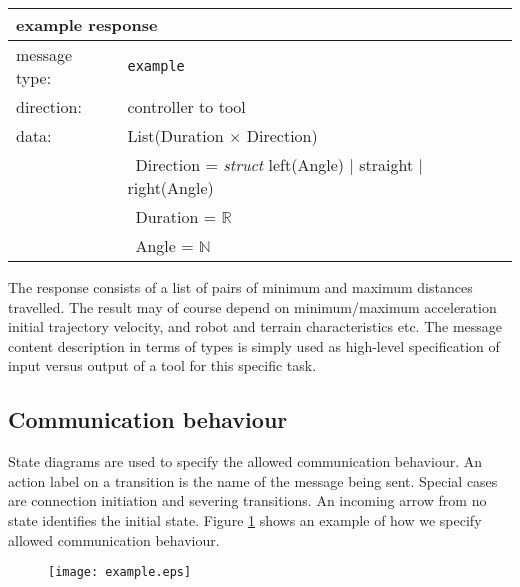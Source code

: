\documentclass{article}
\newcommand{\msg}[1]{\texttt{#1}}
\begin{document}
   \begin{table}[H]
    \begin{center}
     \begin{tabular}{|ll|}
      \hline
       \multicolumn{2}{|l|}{\textbf{example response}} \\
      \hline
       message type:    & \msg{example} \\
      \hline
       direction:       & controller to tool \\
      \hline
       data:            & List(Duration $\times$ Direction) \\
                        & \ Direction = \textit{struct } left(Angle) $|$ straight $|$ right(Angle) \\
                        & \ Duration  = $\mathbb{R}$ \\
                        & \ Angle     = $\mathbb{N}$ \\
      \hline
     \end{tabular}
    \end{center}
    \vspace{-0.5cm}
   \end{table}

   \noindent The response consists of a list of pairs of minimum and maximum
   distances travelled. The result may of course depend on minimum/maximum
   acceleration initial trajectory velocity, and robot and terrain
   characteristics etc. The message content description in terms of types is
   simply used as high-level specification of input versus output of a tool for
   this specific task.

  \subsection{Communication behaviour}
   
   State diagrams are used to specify the allowed communication behaviour. An
   action label on a transition is the name of the message being sent. Special
   cases are connection initiation and severing transitions.  An incoming arrow
   from no state identifies the initial state. Figure
   \ref{figure:process_example} shows an example of how we specify allowed
   communication behaviour.

   \begin{figure}[H]
    \vspace{-0.3cm}
    \begin{center}
     \texttt{[image: example.eps]}
    \end{center}
    \vspace{-0.5cm}
    \label{figure:process_example}
    \vspace{-0.2cm}
   \end{figure}
\end{document}
